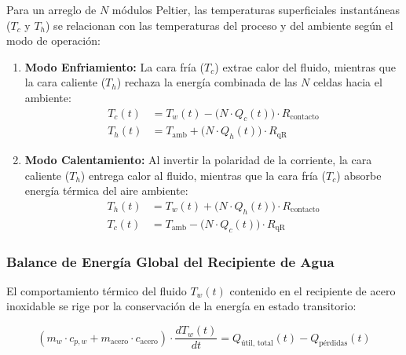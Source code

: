 \documentclass[12pt, a4paper]{article}
\begin{document}
Para un arreglo de $N$ módulos Peltier, las temperaturas superficiales instantáneas ($T_c$ y $T_h$) se relacionan con las temperaturas del proceso y del ambiente según el modo de operación:

\begin{enumerate}
    \item \textbf{Modo Enfriamiento:} La cara fría ($T_c$) extrae calor del fluido, mientras que la cara caliente ($T_h$) rechaza la energía combinada de las $N$ celdas hacia el ambiente:
    \begin{align}
        T_c(t) &= T_w(t) - \big(N \cdot Q_c(t)\big) \cdot R_{\text{contacto}} \label{eq:tc_cool} \\
        T_h(t) &= T_{\text{amb}} + \big(N \cdot Q_h(t)\big) \cdot R_{\text{qR}} \label{eq:th_cool}
    \end{align}
    
    \item \textbf{Modo Calentamiento:} Al invertir la polaridad de la corriente, la cara caliente ($T_h$) entrega calor al fluido, mientras que la cara fría ($T_c$) absorbe energía térmica del aire ambiente:
    \begin{align}
        T_h(t) &= T_w(t) + \big(N \cdot Q_h(t)\big) \cdot R_{\text{contacto}} \label{eq:th_heat} \\
        T_c(t) &= T_{\text{amb}} - \big(N \cdot Q_c(t)\big) \cdot R_{\text{qR}} \label{eq:tc_heat}
    \end{align}
\end{enumerate}

\subsubsection{Balance de Energía Global del Recipiente de Agua}

El comportamiento térmico del fluido $T_w(t)$ contenido en el recipiente de acero inoxidable se rige por la conservación de la energía en estado transitorio:

\begin{equation}
    (m_w \cdot c_{p,w} + m_{\text{acero}} \cdot c_{\text{acero}}) \cdot \frac{dT_w(t)}{dt} = Q_{\text{útil, total}}(t) - Q_{\text{pérdidas}}(t)
    \label{eq:balance_global_tw}
\end{equation}
\end{document}
